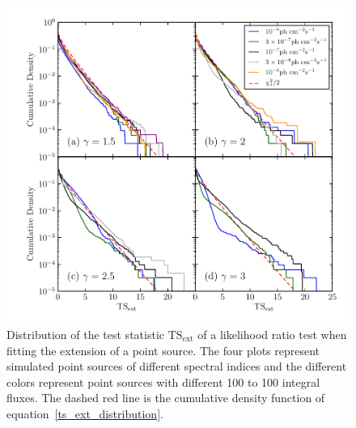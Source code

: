 \documentclass[12pt,preprint]{aastex}
\newcommand{\mev}{\text{MeV}\xspace}
\newcommand{\gev}{\text{GeV}\xspace}
\newcommand{\tsext}{{\ensuremath{\text{TS}_{\text{ext}}}}\xspace}
\begin{document}
\clearpage
\begin{figure}
  \begin{center}
    \includegraphics{mc_plots/ts_ext_emin_1000.pdf}
    \end{center}
    \caption{
    Distribution of the test statistic \tsext of a likelihood ratio
    test when fitting the extension of a point source.  The four plots
    represent simulated point sources of different spectral indices and
    the different colors represent point sources with different 100 \mev
    to 100 \gev integral fluxes.  The dashed red line is the cumulative
    density function of equation~\ref{ts_ext_distribution}.
    }\label{ts_ext_mc}
  \end{figure}

\clearpage
\end{document}
